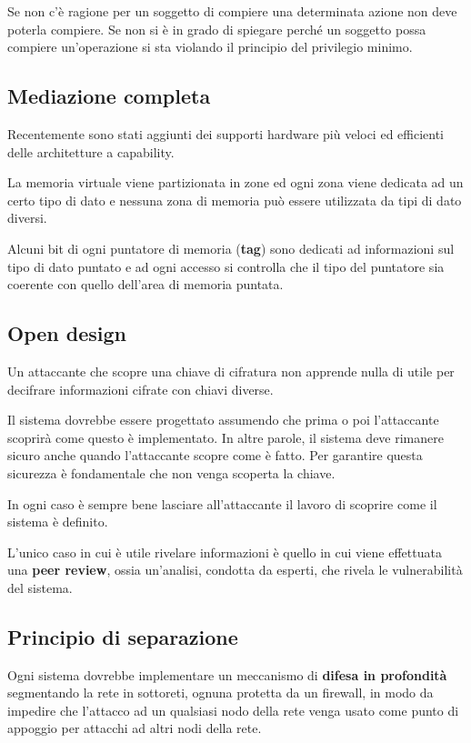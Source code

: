 Se non c'è ragione per un soggetto di compiere una determinata azione non deve poterla compiere. Se non si è in grado
di spiegare perché un soggetto possa compiere un'operazione si sta violando il principio del privilegio minimo.

\subsection{Mediazione completa}
Recentemente sono stati aggiunti dei supporti hardware più veloci ed efficienti delle architetture a capability.

La memoria virtuale viene partizionata in zone ed ogni zona viene dedicata ad un certo tipo di dato e nessuna zona
di memoria può essere utilizzata da tipi di dato diversi.

Alcuni bit di ogni puntatore di memoria (\textbf{tag}) sono dedicati ad informazioni sul tipo di dato puntato e ad
ogni accesso si controlla che il tipo del puntatore sia coerente con quello dell'area di memoria puntata.

\subsection{Open design}
Un attaccante che scopre una chiave di cifratura non apprende nulla di utile per decifrare informazioni cifrate con
chiavi diverse.

Il sistema dovrebbe essere progettato assumendo che prima o poi l'attaccante scoprirà come questo è implementato. In
altre parole, il sistema deve rimanere sicuro anche quando l'attaccante scopre come è fatto. Per garantire questa
sicurezza è fondamentale che non venga scoperta la chiave.

In ogni caso è sempre bene lasciare all'attaccante il lavoro di scoprire come il sistema è definito.

L'unico caso in cui è utile rivelare informazioni è quello in cui viene effettuata una \textbf{peer review}, ossia
un'analisi, condotta da esperti, che rivela le vulnerabilità del sistema.

\subsection{Principio di separazione}
Ogni sistema dovrebbe implementare un meccanismo di \textbf{difesa in profondità} segmentando la rete in sottoreti,
ognuna protetta da un firewall, in modo da impedire che l'attacco ad un qualsiasi nodo della rete venga usato come
punto di appoggio per attacchi ad altri nodi della rete.

